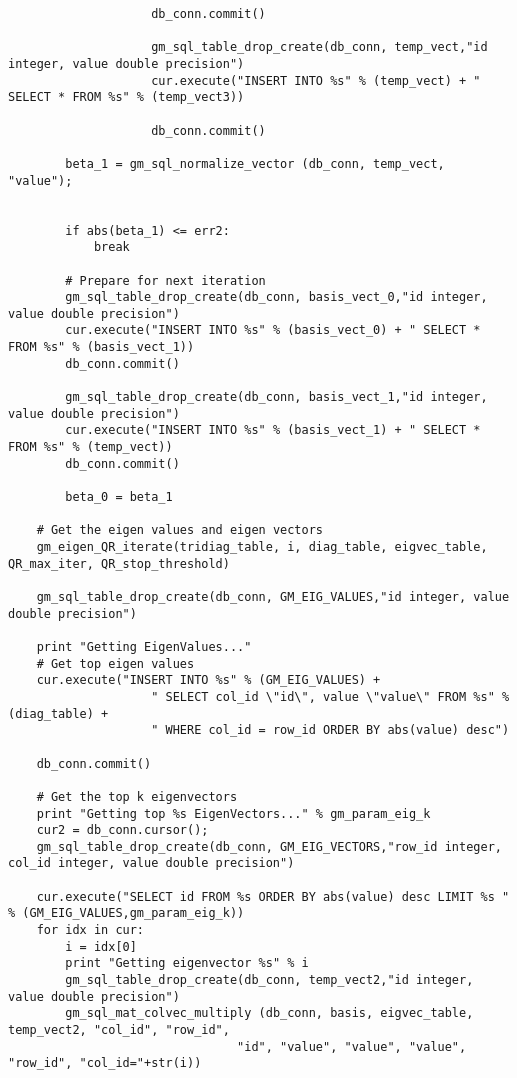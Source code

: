 \begin{lstlisting}
                    db_conn.commit()

                    gm_sql_table_drop_create(db_conn, temp_vect,"id integer, value double precision")
                    cur.execute("INSERT INTO %s" % (temp_vect) + " SELECT * FROM %s" % (temp_vect3))

                    db_conn.commit()

        beta_1 = gm_sql_normalize_vector (db_conn, temp_vect, "value");


        if abs(beta_1) <= err2:
            break

        # Prepare for next iteration
        gm_sql_table_drop_create(db_conn, basis_vect_0,"id integer, value double precision")
        cur.execute("INSERT INTO %s" % (basis_vect_0) + " SELECT * FROM %s" % (basis_vect_1))
        db_conn.commit()

        gm_sql_table_drop_create(db_conn, basis_vect_1,"id integer, value double precision")
        cur.execute("INSERT INTO %s" % (basis_vect_1) + " SELECT * FROM %s" % (temp_vect))
        db_conn.commit()

        beta_0 = beta_1

    # Get the eigen values and eigen vectors
    gm_eigen_QR_iterate(tridiag_table, i, diag_table, eigvec_table, QR_max_iter, QR_stop_threshold)

    gm_sql_table_drop_create(db_conn, GM_EIG_VALUES,"id integer, value double precision")

    print "Getting EigenValues..."
    # Get top eigen values
    cur.execute("INSERT INTO %s" % (GM_EIG_VALUES) +
                    " SELECT col_id \"id\", value \"value\" FROM %s" % (diag_table) +
                    " WHERE col_id = row_id ORDER BY abs(value) desc")

    db_conn.commit()

    # Get the top k eigenvectors
    print "Getting top %s EigenVectors..." % gm_param_eig_k
    cur2 = db_conn.cursor();
    gm_sql_table_drop_create(db_conn, GM_EIG_VECTORS,"row_id integer, col_id integer, value double precision")

    cur.execute("SELECT id FROM %s ORDER BY abs(value) desc LIMIT %s " % (GM_EIG_VALUES,gm_param_eig_k))
    for idx in cur:
        i = idx[0]
        print "Getting eigenvector %s" % i
        gm_sql_table_drop_create(db_conn, temp_vect2,"id integer, value double precision")
        gm_sql_mat_colvec_multiply (db_conn, basis, eigvec_table, temp_vect2, "col_id", "row_id",
                                "id", "value", "value", "value", "row_id", "col_id="+str(i))


\end{lstlisting}
